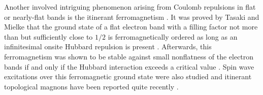 \documentclass[amsmath,superscriptaddress,showpacs,aps,prb,twocolumn]{revtex4-1}
\begin{document}
\par Another involved intriguing phenomenon arising from Coulomb repulsions in flat or nearly-flat bands is the itinerant ferromagnetism \cite{T_PTP1998}. It was proved by Tasaki and Mielke that the ground state of a flat electron band with a filling factor not more than but sufficiently close to $1/2$ is ferromagnetically ordered as long as an infinitesimal onsite Hubbard repulsion is present \cite{T_PRL1992,M_PLA1993,MT_CMP1993}. Afterwards, this ferromagnetism was shown to be stable against small nonflatness of the electron bands if and only if the Hubbard interaction exceeds a critical value \cite{T_PRL1994}. Spin wave excitations over this ferromagnetic ground state were also studied \cite{KA_PRL1994,SGDL_PRB2018} and itinerant topological magnons have been reported quite recently \cite{SGDL_PRB2018}.
\end{document}
